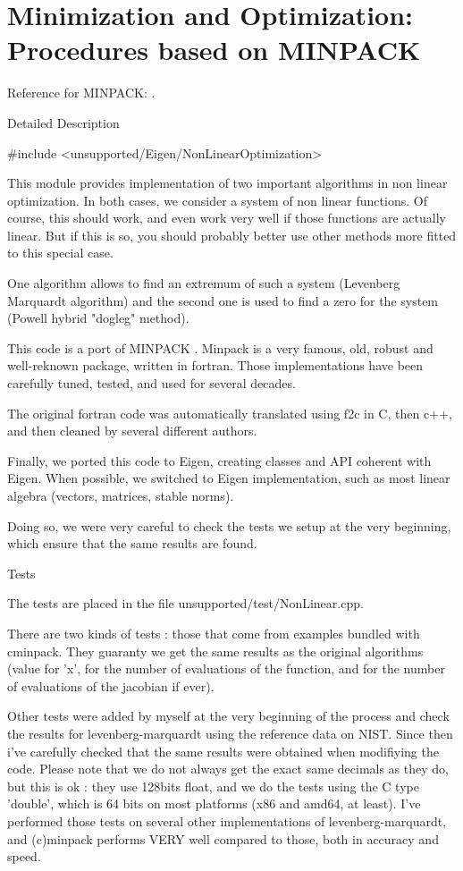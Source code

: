 \chapter{Minimization and Optimization: Procedures based on MINPACK}


Reference for  MINPACK: \cite{More_1980}.

Detailed Description

\#include <unsupported/Eigen/NonLinearOptimization>

This module provides implementation of two important algorithms in non linear optimization. In both cases, we consider a system of non linear functions. Of course, this should work, and even work very well if those functions are actually linear. But if this is so, you should probably better use other methods more fitted to this special case.

One algorithm allows to find an extremum of such a system (Levenberg Marquardt algorithm) and the second one is used to find a zero for the system (Powell hybrid "dogleg" method).

This code is a port of MINPACK . Minpack is a very famous, old, robust and well-reknown package, written in fortran. Those implementations have been carefully tuned, tested, and used for several decades.

The original fortran code was automatically translated using f2c in C, then c++, and then cleaned by several different authors. 

Finally, we ported this code to Eigen, creating classes and API coherent with Eigen. When possible, we switched to Eigen implementation, such as most linear algebra (vectors, matrices, stable norms).

Doing so, we were very careful to check the tests we setup at the very beginning, which ensure that the same results are found.


Tests

The tests are placed in the file unsupported/test/NonLinear.cpp.

There are two kinds of tests : those that come from examples bundled with cminpack. They guaranty we get the same results as the original algorithms (value for 'x', for the number of evaluations of the function, and for the number of evaluations of the jacobian if ever).

Other tests were added by myself at the very beginning of the process and check the results for levenberg-marquardt using the reference data on NIST. Since then i've carefully checked that the same results were obtained when modifiying the code. Please note that we do not always get the exact same decimals as they do, but this is ok : they use 128bits float, and we do the tests using the C type 'double', which is 64 bits on most platforms (x86 and amd64, at least). I've performed those tests on several other implementations of levenberg-marquardt, and (c)minpack performs VERY well compared to those, both in accuracy and speed.

